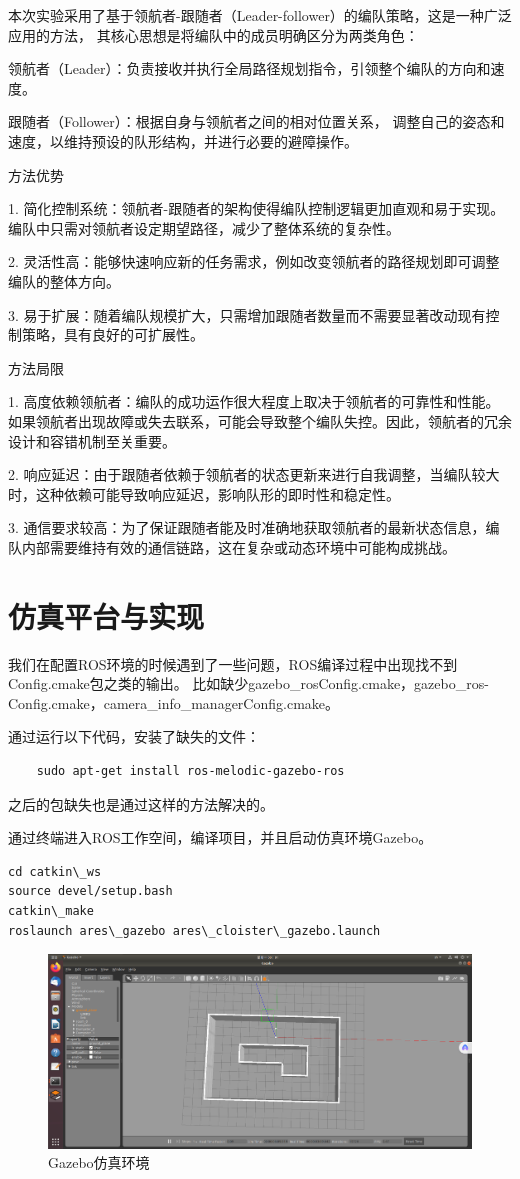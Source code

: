 \documentclass[journal,twoside,web]{ieeecolor}
\begin{document}
本次实验采用了基于领航者-跟随者（Leader-follower）的编队策略，这是一种广泛应用的方法，
其核心思想是将编队中的成员明确区分为两类角色：


领航者（Leader）：负责接收并执行全局路径规划指令，引领整个编队的方向和速度。

跟随者（Follower）：根据自身与领航者之间的相对位置关系，
调整自己的姿态和速度，以维持预设的队形结构，并进行必要的避障操作。

方法优势

1. 简化控制系统：领航者-跟随者的架构使得编队控制逻辑更加直观和易于实现。编队中只需对领航者设定期望路径，减少了整体系统的复杂性。

2. 灵活性高：能够快速响应新的任务需求，例如改变领航者的路径规划即可调整编队的整体方向。

3. 易于扩展：随着编队规模扩大，只需增加跟随者数量而不需要显著改动现有控制策略，具有良好的可扩展性。

方法局限


1. 高度依赖领航者：编队的成功运作很大程度上取决于领航者的可靠性和性能。
如果领航者出现故障或失去联系，可能会导致整个编队失控。因此，领航者的冗余设计和容错机制至关重要。

2. 响应延迟：由于跟随者依赖于领航者的状态更新来进行自我调整，当编队较大时，这种依赖可能导致响应延迟，影响队形的即时性和稳定性。

3. 通信要求较高：为了保证跟随者能及时准确地获取领航者的最新状态信息，编队内部需要维持有效的通信链路，这在复杂或动态环境中可能构成挑战。
 
\section{仿真平台与实现}
我们在配置ROS环境的时候遇到了一些问题，ROS编译过程中出现找不到Config.cmake包之类的输出。
比如缺少gazebo\_rosConfig.cmake，gazebo\_ros-Config.cmake，camera\_info\_managerConfig.cmake。

通过运行以下代码，安装了缺失的文件：
\begin{lstlisting}
    sudo apt-get install ros-melodic-gazebo-ros
\end{lstlisting}
之后的包缺失也是通过这样的方法解决的。

通过终端进入ROS工作空间，编译项目，并且启动仿真环境Gazebo。
\begin{lstlisting}
cd catkin\_ws
source devel/setup.bash
catkin\_make
roslaunch ares\_gazebo ares\_cloister\_gazebo.launch
\end{lstlisting}

\begin{figure}[H]
    \centering
    \includegraphics[width=0.8\linewidth]{img/1.jpg}
    \caption{Gazebo仿真环境}
\end{figure}
\end{document}
